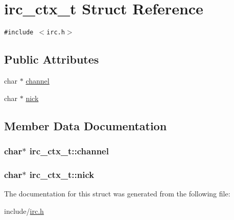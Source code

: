 \hypertarget{structirc__ctx__t}{
\section{irc\_\-ctx\_\-t Struct Reference}
\label{structirc__ctx__t}
}
{\tt \#include $<$irc.h$>$}

\subsection*{Public Attributes}
\begin{CompactItemize}
\item 
char $\ast$ \hyperlink{structirc__ctx__t_dab1f1a75877f72917167b372f546db9}{channel}
\item 
char $\ast$ \hyperlink{structirc__ctx__t_b2ad2d142339cd2dbf30542193326757}{nick}
\end{CompactItemize}


\subsection{Member Data Documentation}
\hypertarget{structirc__ctx__t_dab1f1a75877f72917167b372f546db9}{
\subsubsection[channel]{\setlength{\rightskip}{0pt plus 5cm}char$\ast$ {\bf irc\_\-ctx\_\-t::channel}}}
\label{structirc__ctx__t_dab1f1a75877f72917167b372f546db9}


\hypertarget{structirc__ctx__t_b2ad2d142339cd2dbf30542193326757}{
\subsubsection[nick]{\setlength{\rightskip}{0pt plus 5cm}char$\ast$ {\bf irc\_\-ctx\_\-t::nick}}}
\label{structirc__ctx__t_b2ad2d142339cd2dbf30542193326757}




The documentation for this struct was generated from the following file:\begin{CompactItemize}
\item 
include/\hyperlink{irc_8h}{irc.h}\end{CompactItemize}
